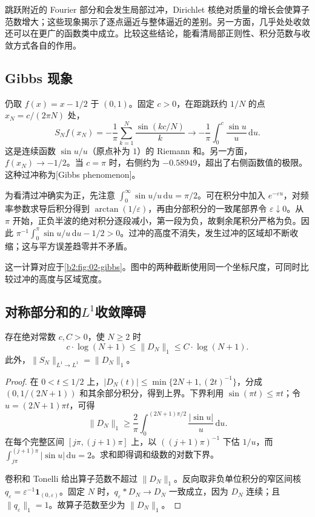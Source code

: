 
跳跃附近的 Fourier 部分和会发生局部过冲，Dirichlet 核绝对质量的增长会使算子范数增大；这些现象揭示了逐点逼近与整体逼近的差别。另一方面，几乎处处收敛还可以在更广的函数类中成立。比较这些结论，能看清局部正则性、积分范数与收敛方式各自的作用。

\subsection{Gibbs 现象}
\label{b2:subsec:020701}

仍取 \(f(x)=x-1/2\) 于 \((0,1)\)。固定 \(c>0\)，在距跳跃约 \(1/N\) 的点 \(x_N=c/(2\pi N)\) 处，
\[
 S_Nf(x_N)=-\dfrac1\pi\sum_{k=1}^N\dfrac{\sin(kc/N)}k
 \longrightarrow-\dfrac1\pi\int_0^c\dfrac{\sin u}{u}\,\mathrm{d}u.
\]
这是连续函数 \(\sin u/u\)（原点补为 \(1\)）的 Riemann 和。另一方面，\(f(x_N)\to-1/2\)。当 \(c=\pi\) 时，右侧约为 \(-0.58949\)，超出了右侧函数值的极限。这种过冲称为[Gibbs phenomenon]。

\ProseParagraphBreak

为看清过冲确实为正，先注意 \(\int_0^\infty\sin u/u\,\mathrm{d}u=\pi/2\)。可在积分中加入 \(e^{-\varepsilon u}\)，对频率参数求导后积分得到 \(\arctan(1/\varepsilon)\)，再由分部积分的一致尾部界令 \(\varepsilon\downarrow0\)。从 \(\pi\) 开始，正负半波的绝对积分逐段减小，第一段为负，故剩余尾积分严格为负。因此 \(\pi^{-1}\int_0^\pi\sin u/u\,\mathrm{d}u-1/2>0\)。过冲的高度不消失，发生过冲的区域却不断收缩；这与平方误差趋零并不矛盾。

\ProseParagraphBreak

这一计算对应于\cref{b2:fig:02-gibbs}。图中的两种截断使用同一个坐标尺度，可同时比较过冲的高度与区域宽度。


\subsection{对称部分和的\texorpdfstring{\(L^1\)}{L¹}收敛障碍}
\label{b2:subsec:020702}

\begin{proposition}\label{b2:prop:02-lebesgue-constants}
存在绝对常数 \(c,C>0\)，使 \(N\geq2\) 时
\[
 c\cdot\log(N+1)\leq\|D_N\|_1\leq C\cdot\log(N+1).
\]
此外，\(\|S_N\|_{L^1\to L^1}=\|D_N\|_1\)。
\end{proposition}
\begin{proof}
在 \(0<t\leq1/2\) 上，\(|D_N(t)|\leq\min\{2N+1,(2t)^{-1}\}\)，分成 \((0,1/(2N+1))\) 和其余部分积分，得到上界。下界利用 \(\sin(\pi t)\leq\pi t\)；令 \(u=(2N+1)\pi t\)，可得
\[
 \|D_N\|_1\geq\dfrac2\pi\int_0^{(2N+1)\pi/2}\dfrac{|\sin u|}{u}\,\mathrm{d}u.
\]
在每个完整区间 \([j\pi,(j+1)\pi]\) 上，以 \(((j+1)\pi)^{-1}\) 下估 \(1/u\)，而 \(\int_{j\pi}^{(j+1)\pi}|\sin u|\,\mathrm{d}u=2\)。求和即得调和级数的对数下界。

卷积和 Tonelli 给出算子范数不超过 \(\|D_N\|_1\)。反向取非负单位积分的窄区间核 \(q_\varepsilon=\varepsilon^{-1}\mathbf1_{(0,\varepsilon)}\)。固定 \(N\) 时，\(q_\varepsilon*D_N\to D_N\) 一致成立，因为 \(D_N\) 连续；且 \(\|q_\varepsilon\|_1=1\)。故算子范数至少为 \(\|D_N\|_1\)。
\end{proof}


